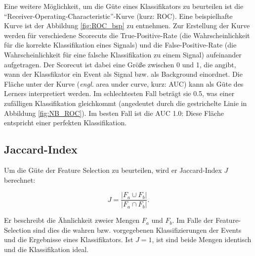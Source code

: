 Eine weitere Möglichkeit, um die Güte eines Klassifikators zu beurteilen ist die \enquote{Receiver-Operating-Characteristic}-Kurve (kurz: ROC). Eine beispielhafte Kurve ist der Abbildung \ref{fig:ROC_bsp} zu entnehmen. Zur Erstellung der Kurve werden für verschiedene Scorecuts die True-Positive-Rate (die Wahrscheinlichkeit für die korrekte Klassifikation eines Signals) und die False-Positive-Rate (die Wahrscheinlichkeit für eine falsche Klassifikation zu einem Signal) aufeinander aufgetragen. Der Scorecut ist dabei eine Größe zwischen 0 und 1, die angibt, wann der Klassfikator ein Event als Signal bzw. als Background einordnet. Die Fläche unter der Kurve (\textit{engl.} area under curve, kurz: AUC) kann als Güte des Lerners interpretiert werden. Im schlechtesten Fall beträgt sie 0.5, was einer zufälligen Klassifikation gleichkommt (angedeutet durch die gestrichelte Linie in Abbildung \ref{fig:NB_ROC}). Im besten Fall ist die AUC 1.0: Diese Fläche entspricht einer perfekten Klassifikation.

\subsection{Jaccard-Index}
Um die Güte der Feature Selection zu beurteilen, wird er Jaccard-Index $J$ berechnet:

\begin{equation}
	J=\frac{|F_a \cup F_b|}{|F_a \cap F_b|}.
	\label{eqn:jaccard}
\end{equation}

Er beschreibt die Ähnlichkeit zweier Mengen $F_a$ und $F_b$. Im Falle der Feature-Selection sind dies die wahren bzw. vorgegebenen Klassifizierungen der Events und die Ergebnisse eines Klassifikators. Ist $J = 1$, ist sind beide Mengen identisch und die Klassifikation ideal.